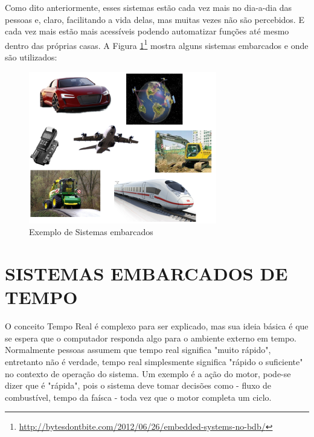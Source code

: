 Como dito anteriormente, esses sistemas estão cada vez mais no dia-a-dia das pessoas e, claro, facilitando a vida delas, mas muitas vezes não são percebidos. E cada vez mais estão mais acessíveis podendo automatizar funções até mesmo dentro das próprias casas. A Figura \ref{fig:exemplosistemasembarcados}\footnote{\url{http://bytesdontbite.com/2012/06/26/embedded-systems-no-bdb/}} mostra alguns sistemas embarcados e onde são utilizados:

\begin{figure}[htp]
	\centering
	\includegraphics[scale=1]{images/exemplo_sistemas_embarcados.png}
	\caption{Exemplo de Sistemas embarcados}	
	\label{fig:exemplosistemasembarcados}	
\end{figure}

\section{SISTEMAS EMBARCADOS DE TEMPO}
O conceito Tempo Real é complexo para ser explicado, mas sua ideia básica é que se espera que o computador responda algo para o ambiente externo em tempo. Normalmente pessoas assumem que tempo real significa "muito rápido", entretanto não é verdade, tempo real simplesmente significa "rápido o suficiente" no contexto de operação do sistema. Um exemplo é a ação do motor, pode-se dizer que é "rápida", pois o sistema deve tomar decisões como - fluxo de combustível, tempo da faísca - toda vez que o motor completa um ciclo.

